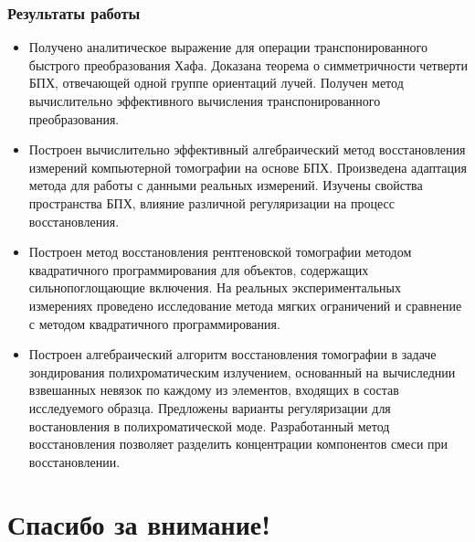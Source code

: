 \documentclass[12pt]{beamer}
\begin{document}
\begin{frame}
\frametitle{Результаты работы}
\begin{itemize}
  \item Получено аналитическое выражение для операции транспонированного быстрого преобразования Хафа. Доказана теорема о симметричности четверти БПХ, отвечающей одной группе ориентаций лучей. Получен метод вычислительно эффективного вычисления транспонированного преобразования.
  \item Построен вычислительно эффективный алгебраический метод восстановления измерений компьютерной томографии на основе БПХ. Произведена адаптация метода для работы с данными реальных измерений. Изучены свойства пространства БПХ, влияние различной регуляризации на процесс восстановления.
  \item Построен метод восстановления рентгеновской томографии методом квадратичного программирования для объектов, содержащих сильнопоглощающие включения. На реальных экспериментальных измерениях проведено исследование метода мягких ограничений и сравнение с методом квадратичного программирования.
  \item Построен алгебраический алгоритм восстановления томографии в задаче зондирования полихроматическим излучением, основанный на вычиследнии взвешанных невязок по каждому из элементов, входящих в состав исследуемого образца. Предложены варианты регуляризации для востановления в полихроматической моде. Разработанный метод восстановления позволяет разделить концентрации компонентов смеси при восстановлении.
\end{itemize}
\end{frame}

\section{Спасибо за внимание!}
\end{document}
